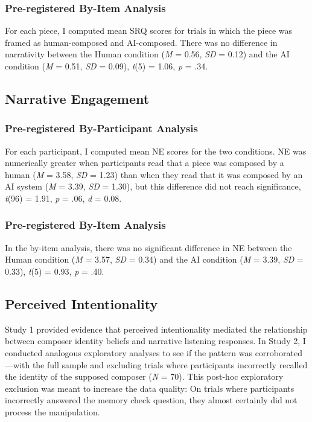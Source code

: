 \documentclass[12pt,twoside]{reedthesis}
\begin{document}
\subsubsection*{Pre-registered By-Item Analysis}

For each piece, I computed mean SRQ scores for trials in which the piece was framed as human-composed and AI-composed. There was no difference in narrativity between the Human condition (\emph{M} = 0.56, \emph{SD} = 0.12) and the AI condition (\emph{M} = 0.51, \emph{SD} = 0.09), \emph{t}(5) = 1.06, \emph{p} = .34.

\subsection*{Narrative Engagement}
\subsubsection*{Pre-registered By-Participant Analysis}
For each participant, I computed mean NE scores for the two conditions. NE was numerically greater when participants read that a piece was composed by a human (\emph{M} = 3.58, \emph{SD} = 1.23) than when they read that it was composed by an AI system (\emph{M} = 3.39, \emph{SD} = 1.30), but this difference did not reach significance, \emph{t}(96) = 1.91, \emph{p} = .06, \emph{d} = 0.08.
\subsubsection*{Pre-registered By-Item Analysis}
In the by-item analysis, there was no significant difference in NE between the Human condition (\emph{M} = 3.57, \emph{SD} = 0.34) and the AI condition (\emph{M} = 3.39, \emph{SD} = 0.33), \emph{t}(5) = 0.93, \emph{p} = .40. 

\subsection*{Perceived Intentionality}
Study 1 provided evidence that perceived intentionality mediated the relationship between composer identity beliefs and narrative listening responses. In Study 2, I conducted analogous exploratory analyses to see if the pattern was corroborated—with the full sample and excluding trials where participants incorrectly recalled the identity of the supposed composer (\emph{N} = 70). This post-hoc exploratory exclusion was meant to increase the data quality: On trials where participants incorrectly answered the memory check question, they almost certainly did not process the manipulation.
\end{document}
